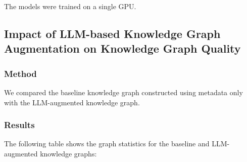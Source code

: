 \documentclass{article}
\begin{document}
The models were trained on a single GPU. 

\subsection{Impact of LLM-based Knowledge Graph Augmentation on Knowledge Graph
    Quality}

\subsubsection{Method}
We compared the baseline knowledge graph constructed using metadata only with
the LLM-augmented knowledge graph.

\subsubsection{Results}
The following table shows the graph statistics for the baseline and LLM-augmented knowledge graphs:
\end{document}
